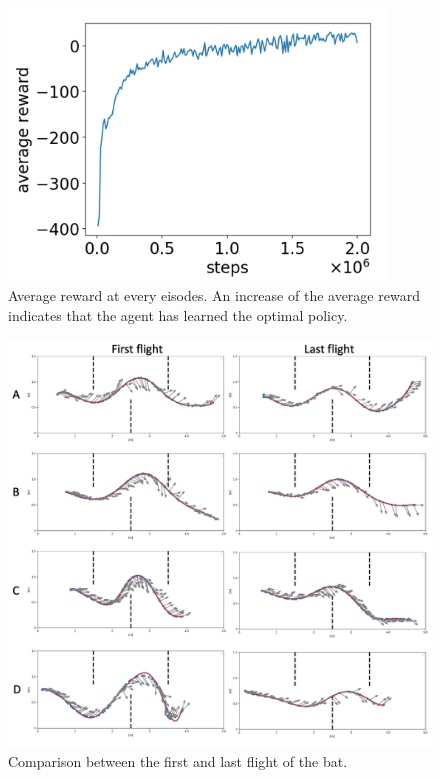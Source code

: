 \documentclass[../main]{subfiles}
\begin{document}
\newpage
{}
\begin{figure}[H]
  \centering
  \vfill
  \includegraphics[width=10cm]{figures/training_development.png}
  \caption{
    Average reward at every eisodes.
    An increase of the average reward indicates that 
    the agent has learned the optimal policy.
  }\label{fig:avearge_reward}
\end{figure}


\newpage
{}
\begin{figure}[H]
  \centering
  \vfill
  \includegraphics[width=14cm]{figures/bat_trajectories.png}
  \caption{
    Comparison between the first and last flight of the bat.
  }\label{fig:bat_trajectories}
\end{figure}
\end{document}
